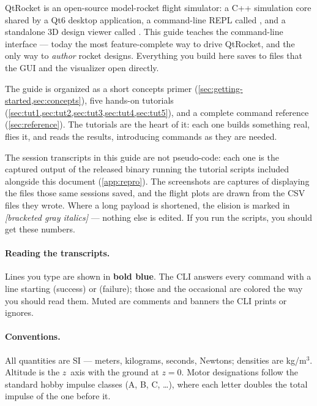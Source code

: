 QtRocket is an open-source model-rocket flight simulator: a C++ simulation core
shared by a Qt6 desktop application, a command-line REPL called
, and a standalone 3D design viewer called
. This guide teaches the command-line interface ---
today the most feature-complete way to drive QtRocket, and the only way to
\emph{author} rocket designs. Everything you build here saves to 
files that the GUI and the visualizer open directly.

The guide is organized as a short concepts primer
(\cref{sec:getting-started,sec:concepts}), five hands-on tutorials
(\cref{sec:tut1,sec:tut2,sec:tut3,sec:tut4,sec:tut5}), and a complete command
reference (\cref{sec:reference}). The tutorials are the heart of it: each one
builds something real, flies it, and reads the results, introducing commands as
they are needed.

\begin{note}
The session transcripts in this guide are not pseudo-code: each one
is the captured output of the released  binary running the
tutorial scripts included alongside this document (\cref{app:repro}). The
screenshots are captures of  displaying the
 files those same sessions saved, and the flight plots are drawn
from the CSV files they wrote. Where a long payload is shortened, the elision
is marked in \textcolor{qrGray}{\textit{[bracketed gray italics]}} --- nothing
else is edited. If you run the scripts, you should get these numbers.
\end{note}

\paragraph{Reading the transcripts.} Lines you type are shown in
\textcolor{qrBlue}{\textbf{bold blue}}. The CLI answers every command with a
line starting \ok{} (success) or \err{} (failure); those and the occasional
 are colored the way you should read them. Muted
 are comments and banners the CLI prints or ignores.

\paragraph{Conventions.} All quantities are SI --- meters, kilograms, seconds,
Newtons; densities are kg/m$^3$. Altitude is the $z$~axis with the ground at
$z=0$. Motor designations follow the standard hobby impulse classes (A, B, C,
\dots), where each letter doubles the total impulse of the one before it.

